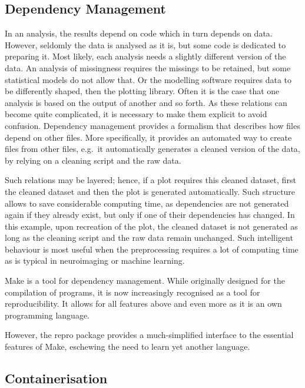 \documentclass[12pt,a4paper,]{article}
\begin{document}
\hypertarget{dependency-management}{%
\subsection{Dependency Management}\label{dependency-management}}

In an analysis, the results depend on code which in turn depends on data.
However, seldomly the data is analysed as it is, but some code is dedicated to preparing it.
Most likely, each analysis needs a slightly different version of the data.
An analysis of missingness requires the missings to be retained, but some statistical models do not allow that.
Or the modelling software requires data to be differently shaped, then the plotting library.
Often it is the case that one analysis is based on the output of another and so forth.
As these relations can become quite complicated, it is necessary to make them explicit to avoid confusion.
Dependency management provides a formalism that describes how files depend on other files.
More specifically, it provides an automated way to create files from other files, e.g.~it automatically generates a cleaned version of the data, by relying on a cleaning script and the raw data.

Such relations may be layered; hence, if a plot requires this cleaned dataset, first the cleaned dataset and then the plot is generated automatically.
Such structure allows to save considerable computing time, as dependencies are not generated again if they already exist, but only if one of their dependencies has changed.
In this example, upon recreation of the plot, the cleaned dataset is not generated as long as the cleaning script and the raw data remain unchanged.
Such intelligent behaviour is most useful when the preprocessing requires a lot of computing time as is typical in neuroimaging or machine learning.

Make is a tool for dependency management. While originally designed for the compilation of programs, it is now increasingly recognised as a tool for reproducibility.
It allows for all features above and even more as it is an own programming language.

However, the repro package provides a much-simplified interface to the essential features of Make, eschewing the need to learn yet another language.

\hypertarget{containerisation}{%
\subsection{Containerisation}\label{containerisation}}
\end{document}
